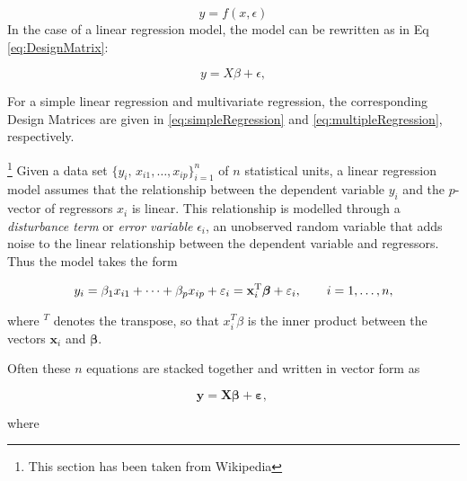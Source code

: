 \begin{equation}
  y =f(x,\epsilon)
\end{equation}
In the case of a linear regression model, the model can be rewritten as in Eq \ref{eq:DesignMatrix}:

\begin{equation*}
    y=X\beta+ \epsilon,
\end{equation*}

For a simple linear regression and multivariate regression, the corresponding Design Matrices are given in \ref{eq:simpleRegression} and \ref{eq:multipleRegression}, respectively.

\footnote{This section has been taken from Wikipedia} Given a data set $\{y_i,\, x_{i1}, \ldots, x_{ip}\}_{i=1}^n$ of $n$ statistical units, a linear regression model assumes that the relationship between the dependent variable $y_i$ and the $p$-vector of regressors $x_i$ is linear. This relationship is modelled through a \emph{disturbance term} or \emph{error variable} $\epsilon_i$, an unobserved random variable that adds noise to the linear relationship between the dependent variable and regressors. Thus the model takes the form

\begin{equation}\label{eq:regression}
   y_i = \beta_1   x_{i1} + \cdots + \beta_p x_{ip} + \varepsilon_i
   = \mathbf{x}^{\rm T}_i\boldsymbol\beta + \varepsilon_i,
   \qquad i = 1, \ldots, n,
\end{equation}

where $^T$ denotes the transpose, so that $x_i^T\beta$ is the inner product between the vectors $\mathbf{x}_i$ and $\boldsymbol\beta$.

Often these $n$ equations are stacked together and written in vector form as

\begin{equation}
  \mathbf{y} = \mathbf{X}\boldsymbol\beta + \boldsymbol\varepsilon, \,
\end{equation}

where

